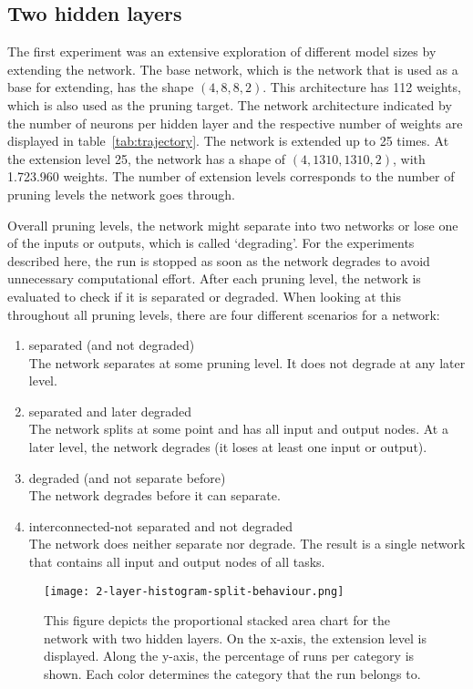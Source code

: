 \subsection{Two hidden layers}\label{two-hidden}
The first experiment was an extensive exploration of different model sizes by extending the network.
The base network, which is the network that is used as a base for extending, has the shape $(4,8,8,2)$.
This architecture has 112 weights, which is also used as the pruning target.
The network architecture indicated by the number of neurons per hidden layer and the respective number of weights are displayed in table~\ref{tab:trajectory}.
The network is extended up to 25 times.
At the extension level 25, the network has a shape of $(4,1310,1310,2)$, with 1.723.960 weights.
The number of extension levels corresponds to the number of pruning levels the network goes through.

Overall pruning levels, the network might separate into two networks or lose one of the inputs or outputs, which is called `degrading'.
For the experiments described here, the run is stopped as soon as the network degrades to avoid unnecessary computational effort.
After each pruning level, the network is evaluated to check if it is separated or degraded.
When looking at this throughout all pruning levels, there are four different scenarios for a network:

\begin{enumerate}
    \item separated (and not degraded)\\
    The network separates at some pruning level. 
    It does not degrade at any later level. 
    \item separated and later degraded \\
    The network splits at some point and has all input and output nodes.
    At a later level, the network degrades (it loses at least one input or output).
    \item degraded (and not separate before) \\
    The network degrades before it can separate.
    \item interconnected-not separated and not degraded \\
    The network does neither separate nor degrade. 
    The result is a single network that contains all input and output nodes of all tasks.
\end{enumerate}

\begin{figure}[ht]
    \centering
    \texttt{[image: 2-layer-histogram-split-behaviour.png]}
    \caption{
        This figure depicts the proportional stacked area chart for the network with two hidden layers.
        On the x-axis, the extension level is displayed. 
        Along the y-axis, the percentage of runs per category is shown.
        Each color determines the category that the run belongs to.
        }\label{fig:2laxer-histogram}
\end{figure}

